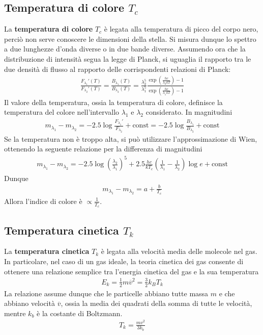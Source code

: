 \documentclass[a4paper, oneside]{book}
\begin{document}
\subsection{Temperatura di colore $T_c$}
La \textbf{temperatura di colore} $T_c$ è legata alla temperatura di picco del corpo 
nero, perciò non serve conoscere le dimensioni della stella. Si misura dunque lo spettro a due 
lunghezze d'onda diverse o in due bande diverse. Assumendo ora che la distribuzione di intensità 
segua la legge di Planck, si uguaglia il rapporto tra le due densità di flusso al rapporto
delle corrispondenti relazioni di Planck:
\begin{gather*}
    \frac{F_{\lambda_1}'(T)}{F_{\lambda_2}'(T)} = \frac{B_{\lambda_1}(T)}{B_{\lambda_2}(T)} = \frac{\lambda_2^{5}}{\lambda_1^{5}} \frac{\exp\left(\frac{hc}{\lambda_2 kT}\right) - 1}{\exp\left(\frac{hc}{\lambda_1 kT}\right) - 1}
\end{gather*}
Il valore della temperatura, ossia la temperatura di colore, definisce la temperatura del colore 
nell'intervallo $\lambda_1$ e $\lambda_2$ considerato. In magnitudini
\begin{gather*}
    m_{\lambda_1} - m_{\lambda_2} = -2.5 \log \frac{F_{\lambda_1}'}{F_{\lambda_2}} + \text{const} = -2.5\log \frac{B_{\lambda_1}}{B_{\lambda_2}} + \text{const}
\end{gather*}
Se la temperatura non è troppo alta, si può utilizzare l'approssimazione di Wien, ottenendo la
seguente relazione per la differenza di magnitudini
\begin{gather*}
    m_{\lambda_1} - m_{\lambda_2} = -2.5 \log \left(\frac{\lambda_2}{\lambda_1}\right)^{5} + 2.5 \frac{hc}{kT_c}\left(\frac{1}{\lambda_1} - \frac{1}{\lambda_2}\right) \log e + \text{const}
\end{gather*}
Dunque
\begin{align}
    m_{\lambda_1} - m_{\lambda_2} = a + \frac{b}{T_c}
\end{align}
Allora l'indice di colore è  $\propto \frac{1}{T_c}$. 

\subsection{Temperatura cinetica $T_k$}
La \textbf{temperatura cinetica} $T_k$ è legata alla velocità media delle molecole nel gas. In particolare, nel caso di un gas ideale, la teoria cinetica dei gas consente di ottenere una relazione
semplice tra l'energia cinetica del gas e la sua temperatura
\begin{gather*}
    E_k = \frac{1}{2}m\overline{v}^{2} = \frac{3}{2}k_BT_k
\end{gather*}
La relazione assume dunque che le particelle abbiano tutte massa $m$ e che abbiano 
 velocità $\overline{v}$, ossia la media dei quadrati della somma di tutte 
le velocità, mentre $k_b$ è la costante di Boltzmann.
\begin{align}
    T_k = \frac{mv^{2}}{3k_b}
\end{align} 
\end{document}
